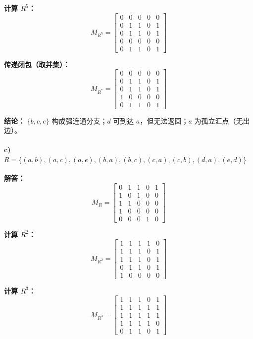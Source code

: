 \documentclass[11pt,UTF8]{article}
\begin{document}
\textbf{计算 $R^5$：}
\[
M_{R^5} = \begin{bmatrix}
0 & 0 & 0 & 0 & 0 \\
0 & 1 & 1 & 0 & 1 \\
0 & 1 & 1 & 0 & 1 \\
0 & 0 & 0 & 0 & 0 \\
0 & 1 & 1 & 0 & 1
\end{bmatrix}
\]

\textbf{传递闭包（取并集）：}
\[
M_{R^*} = \begin{bmatrix}
0 & 0 & 0 & 0 & 0 \\
0 & 1 & 1 & 0 & 1 \\
0 & 1 & 1 & 0 & 1 \\
1 & 0 & 0 & 0 & 0 \\
0 & 1 & 1 & 0 & 1
\end{bmatrix}
\]

\textbf{结论：} $\{b,c,e\}$ 构成强连通分支；$d$ 可到达 $a$，但无法返回；$a$ 为孤立汇点（无出边）。

\paragraph{c) $R = \{(a,b),(a,c),(a,e),(b,a),(b,c),(c,a),(c,b),(d,a),(e,d)\}$}

\textbf{解答：}
\[
M_R = \begin{bmatrix}
0 & 1 & 1 & 0 & 1 \\
1 & 0 & 1 & 0 & 0 \\
1 & 1 & 0 & 0 & 0 \\
1 & 0 & 0 & 0 & 0 \\
0 & 0 & 0 & 1 & 0
\end{bmatrix}
\]

\textbf{计算 $R^2$：}
\[
M_{R^2} = \begin{bmatrix}
1 & 1 & 1 & 1 & 0 \\
1 & 1 & 1 & 0 & 1 \\
1 & 1 & 1 & 0 & 1 \\
0 & 1 & 1 & 0 & 1 \\
1 & 0 & 0 & 0 & 0
\end{bmatrix}
\]

\textbf{计算 $R^3$：}
\[
M_{R^3} = \begin{bmatrix}
1 & 1 & 1 & 0 & 1 \\
1 & 1 & 1 & 1 & 1 \\
1 & 1 & 1 & 1 & 1 \\
1 & 1 & 1 & 1 & 0 \\
0 & 1 & 1 & 0 & 1
\end{bmatrix}
\]
\end{document}
